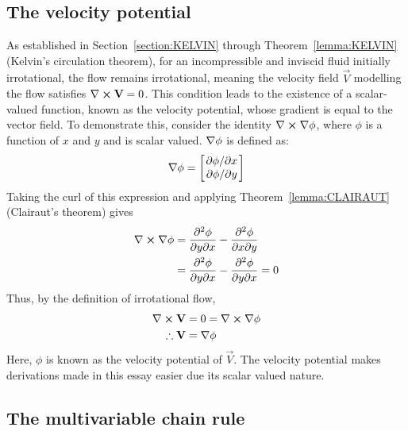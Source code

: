 \subsection{The velocity potential}\label{section:POTENTIAL}
As established in Section~\ref{section:KELVIN} through Theorem~\ref{lemma:KELVIN} (Kelvin's circulation theorem), for an incompressible and inviscid fluid initially irrotational,
the flow remains irrotational, meaning the velocity field $\vec{V}$ modelling the flow satisfies $\curl{\vec{V}}=0$. This condition leads to the existence of a scalar-valued function,
known as the velocity potential, whose gradient is equal to the vector field. To demonstrate this, consider the identity $\curl{\gradient{\phi}}$, where $\phi$ is a function of $x$
and $y$ and is scalar valued. $\nabla\phi$ is defined as:
$$
    \nabla\phi=\begin{bmatrix}
        \pdv*{\phi}{x}\\
        \pdv*{\phi}{y}
    \end{bmatrix}
$$
Taking the curl of this expression and applying Theorem~\ref{lemma:CLAIRAUT} (Clairaut's theorem) gives
\begin{align*}
    \curl{\gradient{\phi}}&=\pdv{\phi}{y}{x}-\pdv{\phi}{x}{y}\\
                             &=\pdv{\phi}{y}{x}-\pdv{\phi}{y}{x}=0
\end{align*}
Thus, by the definition of irrotational flow,
\begin{align*}
    \curl{\vec{V}}&=0=\curl{\gradient{\phi}}\\
    \therefore\vec{V}&=\gradient{\phi}
\end{align*}
Here, $\phi$ is known as the velocity potential of $\vec{V}$. The velocity potential makes derivations made in this essay easier due its scalar valued nature.

\subsection{The multivariable chain rule}
